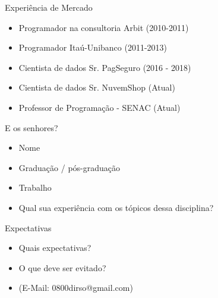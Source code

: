 \begin{frame}	
	\begin{block}{Experiência de Mercado}
		\begin{itemize}
			\item Programador na consultoria Arbit (2010-2011)
			\item Programador Itaú-Unibanco (2011-2013)
			\item Cientista de dados Sr. PagSeguro (2016 - 2018)
			\item Cientista de dados Sr. NuvemShop (Atual)
			\item Professor de Programação - SENAC (Atual)
		\end{itemize}
	\end{block}
\end{frame}

\begin{frame}	
	\begin{block}{E os senhores?}
		\begin{itemize}
			\item Nome
			\item Graduação / pós-graduação
			\item Trabalho
			\item Qual sua experiência com os tópicos dessa disciplina?
		\end{itemize}
	\end{block}
\end{frame}

\begin{frame}	
	\begin{block}{Expectativas}
		\begin{itemize}
			\item Quais expectativas?
			\item O que deve ser evitado?
			\item (E-Mail: 0800dirso@gmail.com)
		\end{itemize}
	\end{block}
\end{frame}